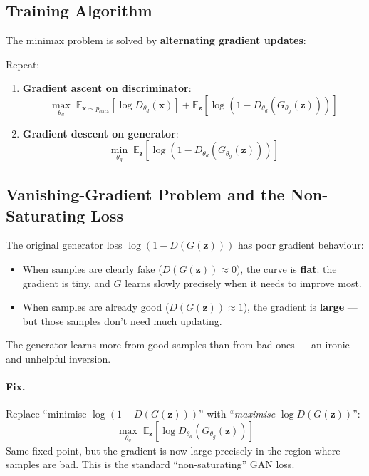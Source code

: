 \documentclass[11pt,a4paper]{article}
\theoremstyle{definition}
\theoremstyle{plain}
\theoremstyle{remark}
\begin{document}
\subsection{Training Algorithm}

The minimax problem is solved by \textbf{alternating gradient updates}:

\begin{tcolorbox}[colback=blue!5!white, colframe=blue!60!black, title={GAN training loop}]
Repeat:
\begin{enumerate}
    \item \textbf{Gradient ascent on discriminator}:
    \[
        \max_{\theta_d} \;\mathbb{E}_{\mathbf{x} \sim p_{\text{data}}}[\log D_{\theta_d}(\mathbf{x})] + \mathbb{E}_{\mathbf{z}}[\log(1 - D_{\theta_d}(G_{\theta_g}(\mathbf{z})))]
    \]
    \item \textbf{Gradient descent on generator}:
    \[
        \min_{\theta_g} \;\mathbb{E}_{\mathbf{z}}[\log(1 - D_{\theta_d}(G_{\theta_g}(\mathbf{z})))]
    \]
\end{enumerate}
\end{tcolorbox}

\subsection{Vanishing-Gradient Problem and the Non-Saturating Loss}

The original generator loss $\log(1 - D(G(\mathbf{z})))$ has poor gradient behaviour:
\begin{itemize}
    \item When samples are clearly fake ($D(G(\mathbf{z})) \approx 0$), the curve is \textbf{flat}: the gradient is tiny, and $G$ learns slowly precisely when it needs to improve most.
    \item When samples are already good ($D(G(\mathbf{z})) \approx 1$), the gradient is \textbf{large} --- but those samples don't need much updating.
\end{itemize}
The generator learns more from good samples than from bad ones --- an ironic and unhelpful inversion.

\paragraph{Fix.} Replace ``minimise $\log(1 - D(G(\mathbf{z})))$'' with ``\emph{maximise} $\log D(G(\mathbf{z}))$'':
\[
    \max_{\theta_g} \;\mathbb{E}_{\mathbf{z}}[\log D_{\theta_d}(G_{\theta_g}(\mathbf{z}))]
\]
Same fixed point, but the gradient is now large precisely in the region where samples are bad. This is the standard ``non-saturating'' GAN loss.
\end{document}
